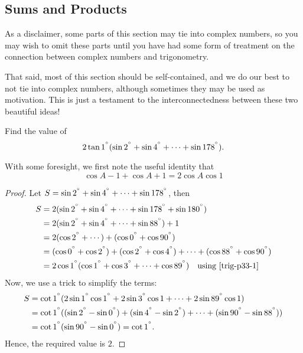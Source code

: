 \documentclass[../jarvis.tex]{subfiles}
\begin{document}
\subsection{Sums and Products \ez}
As a disclaimer, some parts of this section may tie into complex numbers, so you may wish to omit these parts until you have had some form of treatment on the connection between complex numbers and trigonometry.

That said, most of this section should be self-contained, and we do our best to not tie into complex numbers, although sometimes they may be used as motivation. This is just a testament to the interconnectedness between these two beautiful ideas!

\begin{example}[2014 SMO(S) P33]
    Find the value of $$2\tan{1^{^\circ}}(\sin{2^{^\circ}}+\sin{4^{^\circ}}+\cdots+\sin{178^{^\circ}}).$$    
\end{example}
With some foresight, we first note the useful identity that \begin{equation}\label{trig-p33-1}
    \cos{A-1}+\cos{A+1}=2\cos{A}\cos{1}
\end{equation}
\begin{proof}
    Let $S=\sin{2^{^\circ}}+\sin{4^{^\circ}}+\cdots+\sin{178^{^\circ}}$,
    then 
    \begin{align*}
        S&=2(\sin{2^{^\circ}}+\sin{4^{^\circ}}+\cdots+\sin{178^{^\circ}}+\sin{180^{^\circ}}) \\
        &=2(\sin{2^{^\circ}}+\sin{4^{^\circ}}+\cdots+\sin{88^{^\circ}})+1\\
        &=2(\cos{2^{^\circ}}+\cdots)+(\cos{0^{^\circ}}+\cos{90^{^\circ}})\\
        &=(\cos{0^{^\circ}}+\cos{2^{^\circ}})+(\cos{2^{^\circ}}+\cos{4^{^\circ}})+\cdots+(\cos{88^{^\circ}}+\cos{90^{^\circ}})\\
        &=2\cos{1^{^\circ}}(\cos{1^{^\circ}}+\cos{3^{^\circ}}+\cdots+\cos{89^{^\circ}}) \quad\text{using \eqref{trig-p33-1}}\\
    \end{align*}
    Now, we use a trick to simplify the terms:
    \begin{align*}
        S&=\cot{1^{^\circ}}(2\sin{1^{^\circ}}\cos{1^{^\circ}}+2\sin{3^{^\circ}\cos{1}+\cdots+2\sin{89^{^\circ}}}\cos{1}) \\
        &=\cot{1^{^\circ}}((\sin{2^{^\circ}}-\sin{0^{^\circ}})+(\sin{4^{^\circ}-\sin{2^{^\circ}}})+\cdots+(\sin{90^{^\circ}}-\sin{88^{^\circ}}))\\
        &=\cot{1^{^\circ}}(\sin{90^{^\circ}}-\sin{0^{^\circ}})=\cot{1^{^\circ}}.
    \end{align*}
    Hence, the required value is $\boxed{2}$.
\end{proof}
\end{document}
